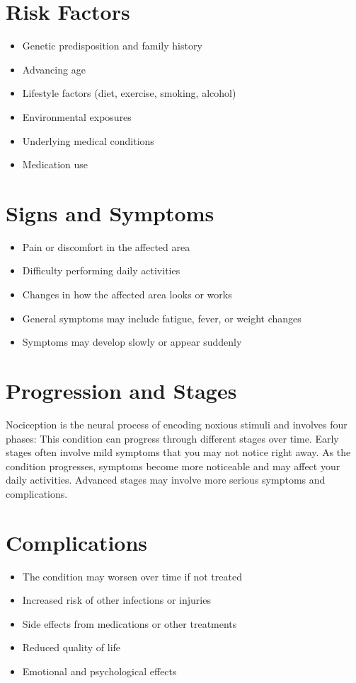 \section{Risk Factors}

\begin{itemize}[noitemsep]
  \item Genetic predisposition and family history
  \item Advancing age
  \item Lifestyle factors (diet, exercise, smoking, alcohol)
  \item Environmental exposures
  \item Underlying medical conditions
  \item Medication use
\end{itemize}

\section{Signs and Symptoms}

\begin{itemize}[noitemsep]
  \item Pain or discomfort in the affected area
  \item Difficulty performing daily activities
  \item Changes in how the affected area looks or works
  \item General symptoms may include fatigue, fever, or weight changes
  \item Symptoms may develop slowly or appear suddenly
\end{itemize}

\section{Progression and Stages}
Nociception is the neural process of encoding noxious stimuli and involves four phases: This condition can progress through different stages over time. Early stages often involve mild symptoms that you may not notice right away. As the condition progresses, symptoms become more noticeable and may affect your daily activities. Advanced stages may involve more serious symptoms and complications.

\section{Complications}

\begin{itemize}[noitemsep]
  \item The condition may worsen over time if not treated
  \item Increased risk of other infections or injuries
  \item Side effects from medications or other treatments
  \item Reduced quality of life
  \item Emotional and psychological effects
\end{itemize}

